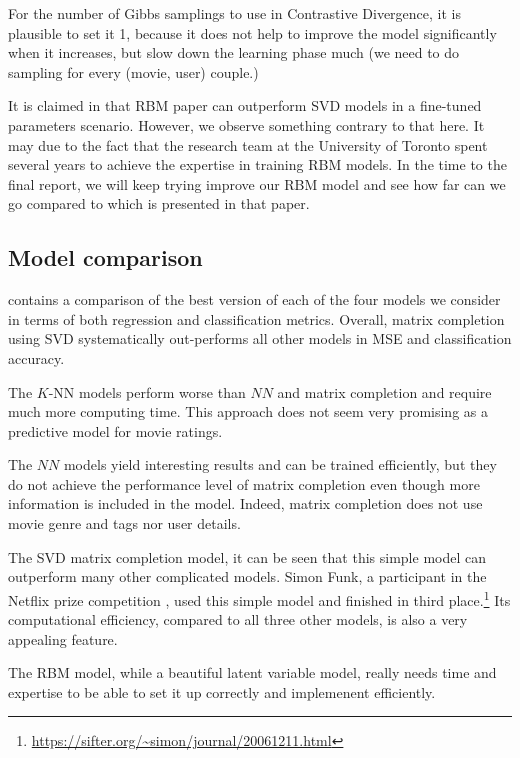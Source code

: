 \documentclass[bj, preprint]{imsart}
\begin{document}
For the number of Gibbs samplings to use in Contrastive Divergence, it is plausible to set it 1, because it does not help to improve the model significantly when it increases, but slow down the learning phase much (we need to do sampling for every (movie, user) couple.)

It is claimed in \cite{10.1145/1273496.1273596} that RBM paper can outperform SVD models in a fine-tuned parameters scenario. However, we observe something contrary to that here. It may due to the fact that the research team at the University of Toronto spent several years to achieve the expertise in training RBM models. In the time to the final report, we will keep trying improve our RBM model and see how far can we go compared to which is presented in that paper.



\subsection{Model comparison}\label{sebsec:results.model}

 contains a comparison of the best version of each of the four models we consider in terms of both regression and classification metrics. Overall, matrix completion using SVD systematically out-performs all other models in MSE and classification accuracy.

The $K$-NN models perform worse than $NN$ and matrix completion and require much more computing time. This approach does not seem very promising as a predictive model for movie ratings.

The $NN$ models yield interesting results and can be trained efficiently, but they do not achieve the performance level of matrix completion even though more information is included in the model. Indeed, matrix completion does not use movie genre and tags nor user details.

The SVD matrix completion model, it can be seen that this simple model can outperform many other complicated models. Simon Funk, a participant in the Netflix prize competition \citep{bennett2007netflix}, used this simple model and finished in third place.\footnote{\url{https://sifter.org/~simon/journal/20061211.html}} Its computational efficiency, compared to all three other models, is also a very appealing feature.

The RBM model, while a beautiful latent variable model, really needs time and expertise to be able to set it up correctly and implemenent efficiently.  
\end{document}
